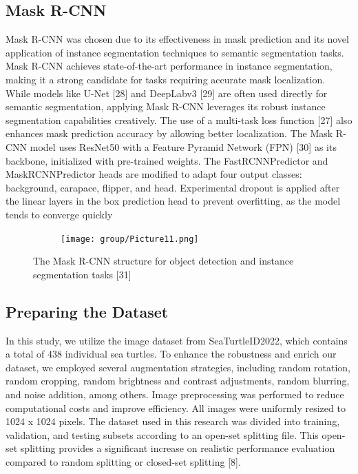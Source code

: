 \documentclass[conference]{IEEEtran}
\begin{document}
\subsection{Mask R-CNN}
Mask R-CNN was chosen due to its effectiveness in mask prediction and its novel application of instance segmentation techniques to semantic segmentation tasks. Mask R-CNN achieves state-of-the-art performance in instance segmentation, making it a strong candidate for tasks requiring accurate mask localization. While models like U-Net [28] and DeepLabv3 [29] are often used directly for semantic segmentation, applying Mask R-CNN leverages its robust instance segmentation capabilities creatively. The use of a multi-task loss function [27] also enhances mask prediction accuracy by allowing better localization. 
The Mask R-CNN model uses ResNet50 with a Feature Pyramid Network (FPN) [30] as its backbone, initialized with pre-trained weights. The FastRCNNPredictor and MaskRCNNPredictor heads are modified to adapt four output classes: background, carapace, flipper, and head. Experimental dropout is applied after the linear layers in the box prediction head to prevent overfitting, as the model tends to converge quickly
\begin{figure}[h]
    \centering
    \begin{subfigure}[t]{0.4\textwidth}
        \centering
        \texttt{[image: group/Picture11.png]}
    \end{subfigure}%
    \caption{The Mask R-CNN structure for object detection and instance segmentation tasks [31]}
\end{figure}
\subsection{Preparing the Dataset}
In this study, we utilize the image dataset from SeaTurtleID2022, which contains a total of 438 individual sea turtles. To enhance the robustness and enrich our dataset, we employed several augmentation strategies, including random rotation, random cropping, random brightness and contrast adjustments, random blurring, and noise addition, among others. Image preprocessing was performed to reduce computational costs and improve efficiency. All images were uniformly resized to 1024 x 1024 pixels. The dataset used in this research was divided into training, validation, and testing subsets according to an open-set splitting file. This open-set splitting provides a significant increase on realistic performance evaluation compared to random splitting or closed-set splitting [8]. 
\end{document}
